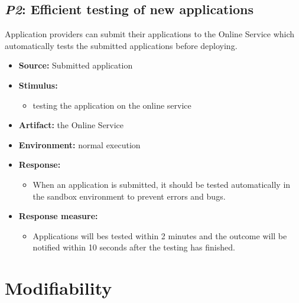 \documentclass[english]{sareport}
\begin{document}
\subsection{\emph{P2}: Efficient testing of new applications}
Application providers can submit their applications to the Online Service which automatically tests the submitted applications before deploying.

\begin{itemize}
    \item \textbf{Source:} Submitted application
    \item \textbf{Stimulus:}
        \begin{itemize}
            \item testing the application on the online service
        \end{itemize}

    \item \textbf{Artifact:} the Online Service
    \item \textbf{Environment:} normal execution
    \item \textbf{Response:}
        \begin{itemize}
            \item When an application is submitted, it should be tested automatically in the sandbox environment to prevent errors and bugs.
        \end{itemize}
    \item \textbf{Response measure:}
        \begin{itemize}
            \item Applications will bes tested within 2 minutes and the outcome will be notified within 10 seconds after the testing has finished.
        \end{itemize}
\end{itemize}


\section{Modifiability}
\end{document}
